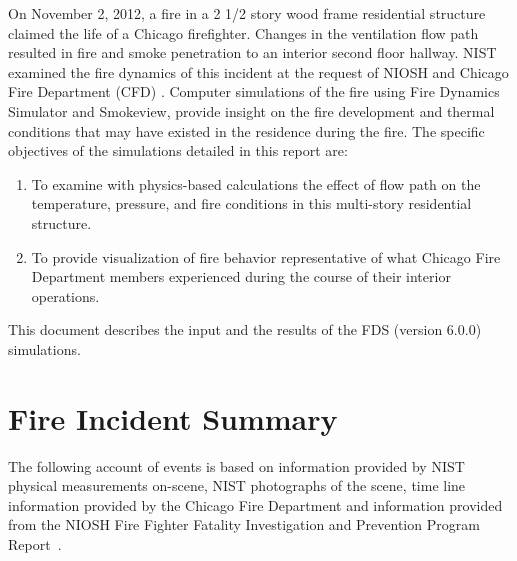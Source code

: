 \documentclass[11pt,oneside]{book}
\begin{document}
On November 2, 2012, a fire in a 2 1/2 story wood frame residential structure claimed the life of a Chicago firefighter.  Changes in the ventilation flow path resulted in fire and smoke penetration to an interior second floor hallway. NIST examined the fire dynamics of this incident at the request of NIOSH and Chicago Fire Department (CFD) . Computer simulations of the fire using Fire Dynamics Simulator and Smokeview, provide insight on the fire development and thermal conditions that may have existed in the residence during the fire. The specific objectives of the simulations detailed in this report are: 
\begin{enumerate}
\item To examine with physics-based calculations the effect of flow path on the temperature, pressure, and fire conditions in this multi-story residential structure.
\item To provide visualization of fire behavior representative of what Chicago Fire Department members experienced during the course of their interior operations.
\end{enumerate}
This document describes the input and the results of the FDS (version 6.0.0) simulations.



\chapter{Fire Incident Summary}
\label{fire_sum}
The following account of events is based on information provided by NIST physical measurements on-scene, NIST photographs of the scene, time line information provided by the Chicago Fire Department and information provided from the NIOSH Fire Fighter Fatality Investigation and Prevention Program Report~\cite{NIOSH:Bowyer}.
\end{document}
